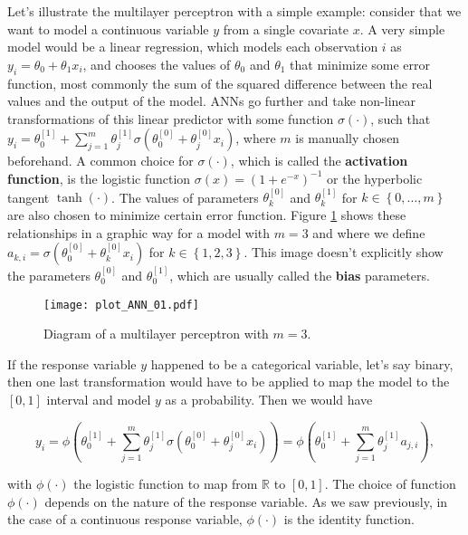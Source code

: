 Let's illustrate the multilayer perceptron with a simple example: consider that we want to model a continuous variable $y$ from a single covariate $x$. A very simple model would be a linear regression, which models each observation $i$ as $y_i = \theta_0 + \theta_1 x_i$, and chooses the values of $\theta_0$ and $\theta_1$ that minimize some error function, most commonly the sum of the squared difference between the real values and the output of the model. ANNs go further and take non-linear transformations of this linear predictor with some function $\sigma(\cdot)$, such that $y_i = \theta_0^{[1]} +  \sum_{j = 1}^m \theta_j^{[1]} \sigma \left( \theta_0^{[0]} + \theta_j^{[0]} x_i \right)$, where $m$ is manually chosen beforehand. A common choice for $\sigma(\cdot)$, which is called the \textbf{activation function}, is the logistic function $\sigma(x) = (1 + e^{-x})^{-1}$
or the hyperbolic tangent $\tanh(\cdot)$. The values of parameters $\theta_k^{[0]}$ and $\theta_k^{[1]}$ for $k \in \left\{ 0, \ldots, m \right\}$ are also chosen to minimize certain error function. Figure \ref{fig:theory_ANN_diagram_01} shows these relationships in a graphic way for a model with $m = 3$ and where we define $a_{k, i} = \sigma \left( \theta_0^{[0]} + \theta_k^{[0]} x_i \right)$ for $k \in \left\{ 1, 2, 3 \right\}$.
This image doesn't explicitly show the parameters $\theta_0^{[0]}$ and $\theta_0^{[1]}$, which are usually called the \textbf{bias} parameters.

\begin{figure}[H]
    \centering
    \texttt{[image: plot\_ANN\_01.pdf]}
    \caption{Diagram of a multilayer perceptron with $m = 3$.}
    \label{fig:theory_ANN_diagram_01}
\end{figure}

If the response variable $y$ happened to be a categorical variable, let's say binary, then one last transformation would have to be applied to map the model to the $\left[0, 1\right]$ interval and model $y$ as a probability. Then we would have

$$
  y_i =
  \phi \left( \theta_0^{[1]} +  \sum_{j = 1}^m \theta_j^{[1]} \sigma \left( \theta_0^{[0]} + \theta_j^{[0]} x_i \right) \right) =
  \phi \left( \theta_0^{[1]} +  \sum_{j = 1}^m \theta_j^{[1]} a_{j,i} \right),
$$

with $\phi(\cdot)$ the logistic function to map from $\mathbb{R}$ to $\left[ 0, 1 \right]$. The choice of function $\phi(\cdot)$ depends on the nature of the response variable. As we saw previously, in the case of a continuous response variable, $\phi(\cdot)$ is the identity function.

